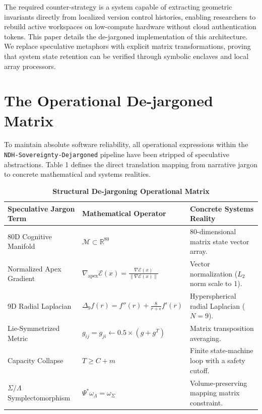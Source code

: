 \documentclass[11pt,fleqn]{article}
\begin{document}
The required counter-strategy is a system capable of extracting geometric invariants directly from localized version control histories, enabling researchers to rebuild active workspaces on low-compute hardware without cloud authentication tokens. This paper details the de-jargoned implementation of this architecture. We replace speculative metaphors with explicit matrix transformations, proving that system state retention can be verified through symbolic enclaves and local array processors.

\section{The Operational De-jargoned Matrix}

To maintain absolute software reliability, all operational expressions within the \texttt{NDH-Sovereignty-Dejargoned} pipeline have been stripped of speculative abstractions. Table 1 defines the direct translation mapping from narrative jargon to concrete mathematical and systems realities.

\begin{table}[h!]
\centering
\caption{\textbf{Structural De-jargoning Operational Matrix}}
\label{tab:dejargon_matrix}
\begin{tabular}{lll}
\toprule
\textbf{Speculative Jargon Term} & \textbf{Mathematical Operator} & \textbf{Concrete Systems Reality} \\
\midrule
80D Cognitive Manifold & $\mathcal{M} \subset \mathbb{R}^{80}$ & 80-dimensional matrix state vector array. \\
\addlinespace
Normalized Apex Gradient & $\nabla_{\mathrm{apex}}\mathcal{E}(x) = \frac{\nabla \mathcal{E}(x)}{\|\nabla \mathcal{E}(x)\|}$ & Vector normalization ($L_2$ norm scale to 1). \\
\addlinespace
9D Radial Laplacian & $\Delta_{9}f(r) = f''(r) + \frac{8}{r+\epsilon}f'(r)$ & Hyperspherical radial Laplacian ($N=9$). \\
\addlinespace
Lie-Symmetrized Metric & $g_{ij} = g_{ji} \leftarrow 0.5 \times (g + g^T)$ & Matrix transposition averaging. \\
\addlinespace
Capacity Collapse & $T \ge C + m$ & Finite state-machine loop with a safety cutoff. \\
\addlinespace
$\Sigma/\Lambda$ Symplectomorphism & $\Psi^*\omega_\Lambda = \omega_\Sigma$ & Volume-preserving mapping matrix constraint. \\
\bottomrule
\end{tabular}
\end{table}
\end{document}
